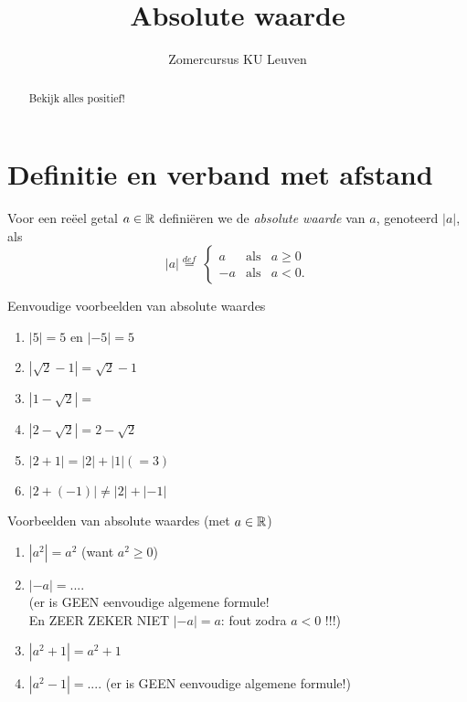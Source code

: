 \documentclass[numbers,wordchoicegiven]{ximera}
\author{Zomercursus KU Leuven}
\title[Rekenvaardigheden:]{Absolute waarde}
\begin{document}
\begin{abstract}
	Bekijk alles positief!
\end{abstract}
\maketitle

\section{Definitie en verband met afstand}\label{basisaw}

\begin{definition}
	Voor een reëel getal $a\in\mathbb{R}$ definiëren we de \textit{absolute waarde} van $a$, genoteerd $|a|$, als
	\[
		|a| \overset{def}{=}\displaystyle\ 
		          \left\{
			\begin{array}{rll  } 
				a  & \mbox{als} & a \geq 0 \\
				-a & \mbox{als} & a<0.
			\end{array}\right.
	\]
\end{definition}

\begin{example} Eenvoudige voorbeelden van absolute waardes
	
		\begin{enumerate}
			\item $|5|=5$ en $|-5|=5$
			\item $|\sqrt{2}-1|=\sqrt{2} - 1$
			\item $|1-\sqrt{2}| = $
			\item $|2-\sqrt{2}| = 2 - \sqrt{2}$
			\item $|2 + 1| = |2| + | 1| (=3)$
			\item $|2 + (-1)| \neq |2| + | -1|$
		\end{enumerate}
\pdfOnly{\end{multicols}}
\end{example}
\begin{example} Voorbeelden van absolute waardes (met $a\in\mathbb{R}$)
		\begin{enumerate}[resume]
			\item $|a^2| = a^2$ (want $a^2 \geq 0$)
			\item $|-a|= ....$ \\ (er is GEEN eenvoudige algemene formule! \\En ZEER ZEKER NIET $|-a|=a$: fout zodra $a<0$ !!!)
			\item $|a^2 + 1| = a^2 + 1$
			\item $|a^2 - 1| = ....$ \qquad(er is GEEN eenvoudige algemene formule!)
\end{enumerate}
\end{example}
\end{document}
